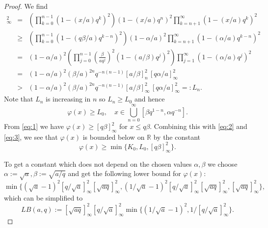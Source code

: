 \documentclass[10pt,a4paper]{amsart}
\newcommand{\R}{\mathbb{R}}
\begin{document}
\begin{proof}
We find
\begin{eqnarray*}
[x/a]_\infty^2&=&\left(\prod_{k=0}^{n-1}(1-(x/a)q^k)^2\right)(1-(x/a)q^n)^2\prod_{k=n+1}^\infty (1-(x/a)q^k)^2\\
&\ge&\left(\prod_{k=0}^{n-1}(1-(q\beta/a)q^{k-n})^2\right)(1-\alpha/a)^2\prod_{k=n+1}^\infty (1-(\alpha/a)q^{k-n})^2\\
&=& (1-\alpha/a)^2\left(\prod_{j=0}^{n-1} \left(\frac{\beta}{aq^j}\right)^{2}(1-(a/\beta)q^j)^2\right)\prod_{j=1}^\infty(1-(\alpha/a)q^j)^2\\
&=&(1-\alpha/a)^2(\beta/a)^{2n}q^{-n(n-1)}[a/\beta]_n^2\,[q\alpha/a]_\infty^2\\
&>&(1-\alpha/a)^2(\beta/a)^{2n}q^{-n(n-1)}[a/\beta]_\infty^2\,[q\alpha/a]_\infty^2=:L_n.
\end{eqnarray*}
Note that $L_n$ is increasing in $n$ so $L_n\ge L_0$ and hence
\begin{equation}\label{eq:3}
\varphi(x)\ge L_0,\quad x\in\bigcup_{n=0}^\infty [\beta q^{1-n},\alpha q^{-n}].
\end{equation}
From \eqref{eq:1} we have $\varphi(x)\ge [q\beta]_\infty^2$ for $x\le q\beta$.
Combining this with \eqref{eq:2} and \eqref{eq:3}, we see that $\varphi(x)$ is bounded below on $\R$ by the constant
$$
\varphi(x)\ge \min\{K_0,L_0,[q\beta]_\infty^2\}.
$$

To get  a constant which does not depend on the chosen values $\alpha,\beta$ we choose
$\alpha:=\sqrt{a}, \beta:=\sqrt{a/q}$ and get the following lower bound for $\varphi(x)$:
$$
\min\{(\sqrt{a}-1)^2[q/\sqrt{a}]_\infty^2[\sqrt{aq}]_\infty^2, (1/\sqrt{a}-1)^2 [q/\sqrt{a}]_\infty^2[\sqrt{aq}]_\infty^2, [\sqrt{aq}]_\infty^2\},
$$
which can be simplified to
\begin{equation}\label{eq:LB}
LB(a,q):=[\sqrt{aq}]_\infty^2[q/\sqrt{a}]_\infty^2\min\{(1/\sqrt{a}-1)^2, 1/[q/\sqrt{a}]_\infty^2\}.
\end{equation}
\end{proof}
\end{document}
